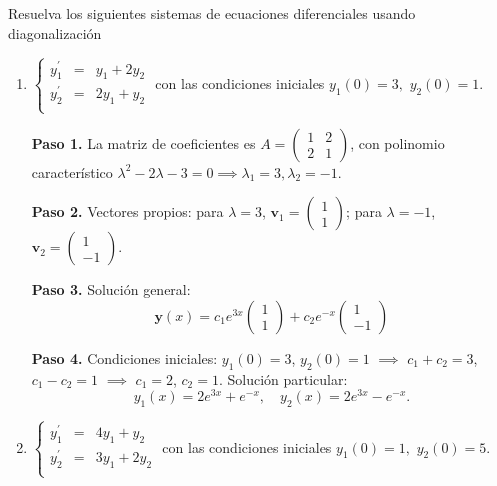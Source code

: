 \begin{prob}
Resuelva los siguientes sistemas de ecuaciones diferenciales usando diagonalización
\begin{enumerate}[$(a)$]
\item $\left\lbrace \begin{matrix}
y_{1}^{\prime}&=&y_1+2y_2\\
y_{2}^{\prime}&=&2y_1+y_2\\
\end{matrix} \right. $ con las condiciones iniciales $y_{1}(0)=3,$ $y_{2}(0)=1.$

\begin{myproof}
\textbf{Paso 1.} La matriz de coeficientes es $A = \begin{pmatrix} 1 & 2 \\ 2 & 1 \end{pmatrix}$, con polinomio característico $\lambda^2 - 2\lambda - 3 = 0 \implies \lambda_1=3, \lambda_2=-1$.

\textbf{Paso 2.} Vectores propios: para $\lambda=3$, $\mathbf{v}_1 = \begin{pmatrix} 1 \\ 1 \end{pmatrix}$; para $\lambda=-1$, $\mathbf{v}_2 = \begin{pmatrix} 1 \\ -1 \end{pmatrix}$.

\textbf{Paso 3.} Solución general:
\[
\mathbf{y}(x) = c_1 e^{3x} \begin{pmatrix} 1 \\ 1 \end{pmatrix} + c_2 e^{-x} \begin{pmatrix} 1 \\ -1 \end{pmatrix}
\]

\textbf{Paso 4.} Condiciones iniciales: $y_1(0)=3$, $y_2(0)=1$ $\implies$ $c_1 + c_2 = 3$, $c_1 - c_2 = 1$ $\implies$ $c_1 = 2$, $c_2 = 1$. Solución particular:
\[
\boxed{y_1(x) = 2e^{3x} + e^{-x},\quad y_2(x) = 2e^{3x} - e^{-x}.}
\]
\end{myproof}

\item $\left\lbrace \begin{matrix}
y_{1}^{\prime}&=&4y_1+y_2\\
y_{2}^{\prime}&=&3y_1+2y_2\\
\end{matrix} \right. $ con las condiciones iniciales $y_{1}(0)=1,$ $y_{2}(0)=5.$


\end{enumerate}
\end{prob}
